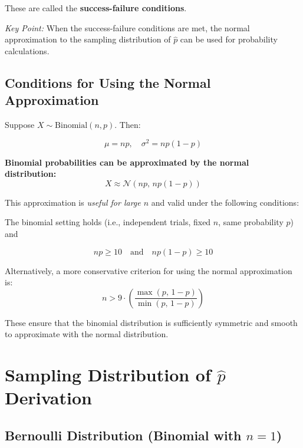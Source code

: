 These are called the \textbf{success-failure conditions}.

\medskip

\textit{Key Point:} When the success-failure conditions are met, the normal approximation to the sampling distribution of \( \hat{p} \) can be used for probability calculations.
\subsection*{Conditions for Using the Normal Approximation}

\vspace{0.5em}

Suppose \( X \sim \text{Binomial}(n, p) \). Then:

\[
\mu = np, \quad \sigma^2 = np(1 - p)
\]

\medskip

\textbf{Binomial probabilities can be approximated by the normal distribution:}
\[
X \approx \mathcal{N}(np, \, np(1 - p))
\]

This approximation is \textit{useful for large \( n \)} and valid under the following conditions:

\begin{tcolorbox}[title=Standard Conditions,
  colback=blue!5, 
  colframe=blue!50!black, 
  coltitle=black,
  colbacktitle=blue!20, %
  fonttitle=\bfseries,
  sharp corners=south,
  boxrule=0.5pt,
  enhanced,
  width=\textwidth,
  breakable]
The binomial setting holds (i.e., independent trials, fixed \( n \), same probability \( p \)) and

\[
np \geq 10 \quad \text{and} \quad np(1 - p) \geq 10
\]
\end{tcolorbox}

\vspace{0.5em}

Alternatively, a more conservative criterion for using the normal approximation is:
\[
n > 9 \cdot \left( \frac{\max(p, \, 1 - p)}{\min(p, \, 1 - p)} \right)
\]

\medskip

These ensure that the binomial distribution is sufficiently symmetric and smooth to approximate with the normal distribution.

\medskip
\section{Sampling Distribution of $\hat{p}$ Derivation}
\subsection*{Bernoulli Distribution (Binomial with $n = 1$)}

